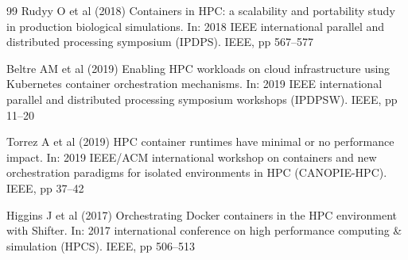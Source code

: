 \documentclass[]{sn-jnl}
\begin{document}
\begin{thebibliography}{99}
Rudyy O et al (2018) Containers in HPC: a scalability and portability study in
production biological simulations. In: 2018 IEEE international parallel and
distributed processing symposium (IPDPS). IEEE, pp 567--577

Beltre AM et al (2019) Enabling HPC workloads on cloud infrastructure using
Kubernetes container orchestration mechanisms. In: 2019 IEEE international
parallel and distributed processing symposium workshops (IPDPSW). IEEE, pp 11--20

Torrez A et al (2019) HPC container runtimes have minimal or no performance
impact. In: 2019 IEEE/ACM international workshop on containers and new
orchestration paradigms for isolated environments in HPC (CANOPIE-HPC).
IEEE, pp 37--42

Higgins J et al (2017) Orchestrating Docker containers in the HPC environment
with Shifter. In: 2017 international conference on high performance computing
\& simulation (HPCS). IEEE, pp 506--513

\end{thebibliography}
\end{document}
